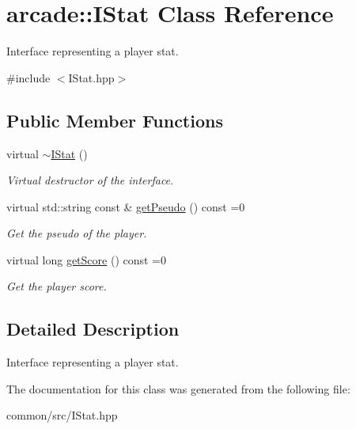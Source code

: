 \hypertarget{classarcade_1_1IStat}{}\section{arcade\+:\+:I\+Stat Class Reference}
\label{classarcade_1_1IStat}


Interface representing a player stat.  




{\ttfamily \#include $<$I\+Stat.\+hpp$>$}

\subsection*{Public Member Functions}
\begin{DoxyCompactItemize}
\item 
\mbox{\label{classarcade_1_1IStat_af8996c563dee5095d30592647fd0f00c}} 
virtual \hyperlink{classarcade_1_1IStat_af8996c563dee5095d30592647fd0f00c}{$\sim$\+I\+Stat} ()
\begin{DoxyCompactList}\small\item\em Virtual destructor of the interface. \end{DoxyCompactList}\item 
\mbox{\label{classarcade_1_1IStat_a6418289d2ae6b3d477ab8a9629487f18}} 
virtual std\+::string const  \& \hyperlink{classarcade_1_1IStat_a6418289d2ae6b3d477ab8a9629487f18}{get\+Pseudo} () const =0
\begin{DoxyCompactList}\small\item\em Get the pseudo of the player. \end{DoxyCompactList}\item 
\mbox{\label{classarcade_1_1IStat_acda674f38783f8d12db43103655642b7}} 
virtual long \hyperlink{classarcade_1_1IStat_acda674f38783f8d12db43103655642b7}{get\+Score} () const =0
\begin{DoxyCompactList}\small\item\em Get the player score. \end{DoxyCompactList}\end{DoxyCompactItemize}


\subsection{Detailed Description}
Interface representing a player stat. 

The documentation for this class was generated from the following file\+:\begin{DoxyCompactItemize}
\item 
common/src/I\+Stat.\+hpp\end{DoxyCompactItemize}
